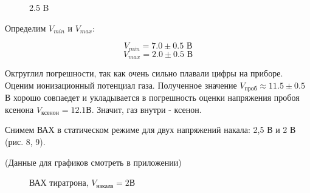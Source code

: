 \documentclass[14pt,a4paper]{scrartcl}
\begin{document}
\begin{figure}[ht!]
\caption{2.5 B}
\end{figure}


Определим $V_{min}$ и $V_{max}$:


$$V_{min} = 7.0 \pm 0.5 \text{ В}$$ 
$$V_{max} = 2.0 \pm 0.5 \text{ В}$$ 


Окгруглил погрешности, так как очень сильно плавали цифры на приборе.  
Оценим ионизационный потенциал газа. Полученное значение $V_{проб} \approx 11.5 \pm 0.5$ В хорошо совпаедет и укладывается в погрешность оценки напряжения пробоя ксенона $V_{ксенон} = 12.1$В. Значит, газ внутри - ксенон.

Снимем ВАХ в статическом режиме для двух напряжений накала: 2,5 В и 2 В (рис. 8, 9).

(Данные для графиков смотреть в приложении)

\begin{figure}[ht!]\label{omega} 
\caption{ВАХ тиратрона, $V_{\text{накала}}=2$В}
\end{figure}
\end{document}
